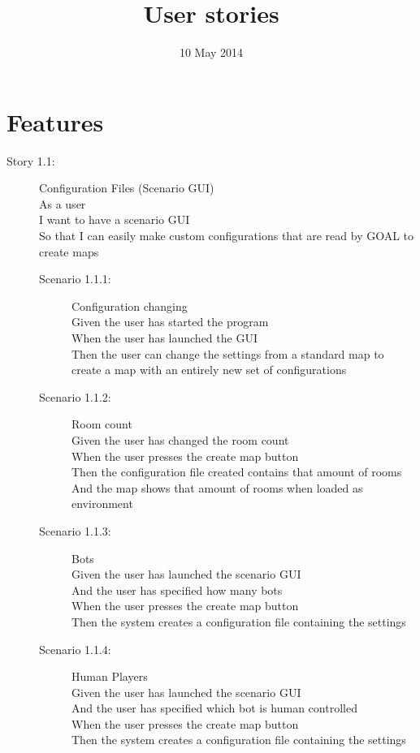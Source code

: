 \documentclass{article}
\title{User stories}
\date{10 May 2014}
\begin{document}
\maketitle
\section{Features}
\begin{description}
  \item[Story 1.1:] Configuration Files (Scenario GUI)\\
  As a user\\
  I want to have a scenario GUI\\
  So that I can easily make custom configurations that are read by GOAL to create maps

  \begin{description}
    \item[Scenario 1.1.1:] Configuration changing\\
    Given the user has started the program\\
    When the user has launched the GUI\\
    Then the user can change the settings from a standard map to create a map with an entirely new set of configurations
    
    \item[Scenario 1.1.2:] Room count\\
    Given the user has changed the room count\\
    When the user presses the create map button\\
    Then the configuration file created contains that amount of rooms\\
    And the map shows that amount of rooms when loaded as environment
    
    \item[Scenario 1.1.3:] Bots\\
    Given the user has launched the scenario GUI\\
    And the user has specified how many bots\\
    When the user presses the create map button\\
    Then the system creates a configuration file containing the settings

    \item[Scenario 1.1.4:] Human Players\\
    Given the user has launched the scenario GUI\\
    And the user has specified which bot is human controlled\\
    When the user presses the create map button\\
    Then the system creates a configuration file containing the settings
    

\end{description}
\end{description}
\end{document}
